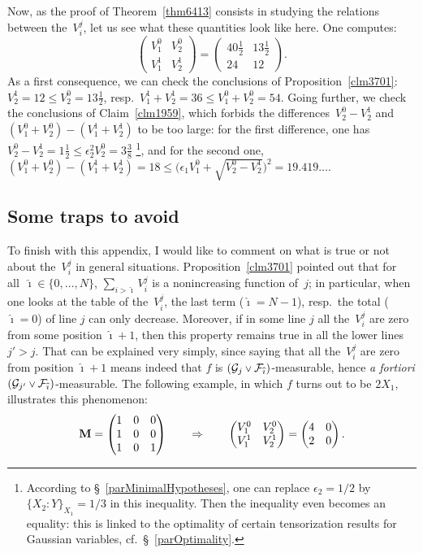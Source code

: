 Now, as the proof of Theorem~\ref{thm6413} consists in studying the relations
between the~$V^j_i$, let us see what these quantities look like here.
One computes:
\[ \begin{pmatrix} V_1^0 & V_2^0 \\ V_1^1 & V_2^1 \end{pmatrix} =
\begin{pmatrix} 40\frac{1}{2} & 13\frac{1}{2} \\ 24 & 12 \end{pmatrix} .\]
As a first consequence, we can check the conclusions of Proposition~\ref{clm3701}:
$V_2^1 = 12 \leq V_2^0 = 13\frac{1}{2}$,
resp.\ $V_1^1+V_2^1 = 36 \leq V_1^0+V_2^0 = 54$.
%
Going further, we check the conclusions of Claim~\ref{clm1959},
which forbids the differences~$V_2^0 - V_2^1$ and~$(V_1^0+V_2^0) - (V_1^1+V_2^1)$
to be too large: for the first difference, one has
$V_2^0 - V_2^1 = 1\frac{1}{2} \leq \epsilon_2^2 V_2^0 = 3\frac{3}{8}$%
\footnote{According to \S~\ref{parMinimalHypotheses},
one can replace $\epsilon_2 = 1/2$ by~$\{X_2:Y\}_{X_1} = 1/3$
in this inequality. Then the inequality even becomes an equality:
this is linked to the optimality of certain tensorization results for Gaussian variables,
cf.\ \S~\ref{parOptimality}.}, and for the second one,
$(V_1^0+V_2^0) - (V_1^1+V_2^1) = 18 \leq
\big( \epsilon_1 V_1^0 + \sqrt{V_2^0-V_2^1} \big)^2 = 19.419\dots$.


\subsection{Some traps to avoid}

To finish with this appendix,
I would like to comment on what is true or not about the~$V^j_i$ in general situations.
Proposition~\ref{clm3701} pointed out that for all~$\hat\imath \in \{0,\ldots,N\}$,
$\sum_{i>\hat\imath} V^j_{i}$ is a nonincreasing function of~$j$;
in particular, when one looks at the table of the~$V^j_i$,
the last term ($\hat\imath=N-1$), resp.\ the total ($\hat\imath=0$) of line $j$
can only decrease.
%
Moreover, if in some line $j$ all the~$V^j_i$ are zero from some position $\hat\imath+1$,
then this property remains true in all the lower lines $j'>j$.
That can be explained very simply, since
saying that all the~$V^j_i$ are zero from position $\hat\imath+1$
means indeed that $f$ is $(\mcal{G}_j\vee\mcal{F}_{\hat\imath})$-measurable,
hence \emph{a fortiori} $(\mcal{G}_{j'}\vee\mcal{F}_{\hat\imath})$-measurable.
%
The following example, in which $f$ turns out to be $2X_1$, illustrates this phenomenon:
\[ \mathbf{M} = \begin{pmatrix} 1&0&0 \\ 1&0&0 \\ 1&0&1 \end{pmatrix}
\qquad \Rightarrow \qquad
\begin{pmatrix} V_1^0 & V_2^0 \\ V_1^1 & V_2^1 \end{pmatrix} =
\begin{pmatrix} 4 & 0 \\ 2 & 0 \end{pmatrix} .\]

